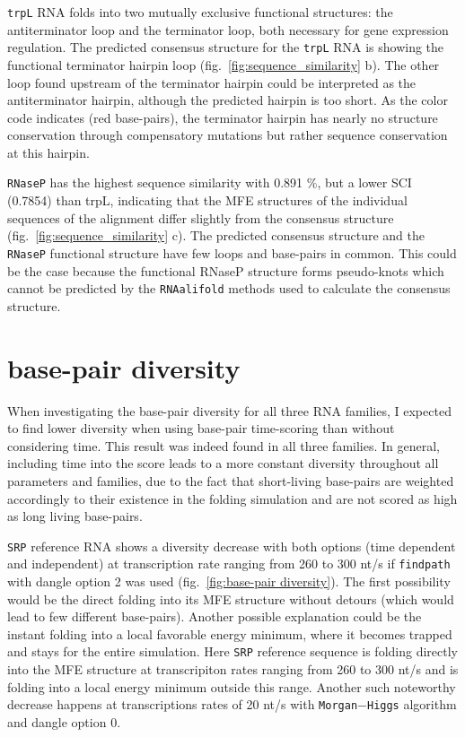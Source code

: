 \documentclass[ twoside,openright,titlepage,numbers=noenddot,headinclude,%
                footinclude=false, cleardoublepage=empty,abstractoff, %
                BCOR=5mm,paper=a4,fontsize=11pt,%
                ngerman,american,%
                ]{scrreprt}
\begin{document}
\texttt{trpL} RNA folds into two mutually exclusive functional structures: the
antiterminator loop and the terminator loop, both necessary for gene
expression regulation. The predicted consensus structure for the \texttt{trpL} RNA
is showing the functional terminator hairpin loop (fig.~\ref{fig:sequence_similarity} b). The other loop found
upstream of the terminator hairpin could be interpreted as the
antiterminator hairpin, although the predicted hairpin is too short. As the
color code indicates (red base-pairs), the terminator hairpin has nearly no
structure conservation through compensatory mutations but rather sequence
conservation at this hairpin.

\texttt{RNaseP} has the highest sequence similarity with 0.891 \%, but a lower SCI
(0.7854) than trpL, indicating that the MFE structures of the individual sequences of the
alignment differ slightly from the consensus structure (fig.~\ref{fig:sequence_similarity} c).
The predicted
consensus structure and the \texttt{RNaseP} functional structure have few loops and
base-pairs in common. This could be the case because the functional RNaseP
structure forms pseudo-knots which cannot be predicted by the
\texttt{RNAalifold} methods used to calculate the consensus structure.


\section{base-pair diversity}

When investigating the base-pair diversity for all three RNA families, I
expected to find lower diversity when using base-pair time-scoring than
without considering time. This result was indeed found in all three
families.
In general, including time into the score leads to a more constant diversity
throughout all parameters and families, due to the fact that short-living
base-pairs are weighted accordingly to their existence in the folding
simulation and are not scored as high as long living base-pairs.

\texttt{SRP} reference RNA shows a diversity decrease with both options (time
dependent and independent) at transcription rate ranging from 260 to 300
nt/s if \texttt{findpath} with dangle option 2 was used
(fig.~\ref{fig:base-pair diversity}).
The first possibility would be the direct folding into its MFE structure
without detours (which would lead to few different 
base-pairs). Another possible explanation could be the instant folding into
a local favorable energy minimum, where it becomes trapped and stays for
the entire simulation. Here \texttt{SRP} reference sequence is folding directly into the MFE structure at transcripiton rates ranging from 260 to 300 nt/s and is folding into a local energy minimum outside this range.
Another such noteworthy decrease happens at transcriptions rates of 20 nt/s with
\texttt{Morgan$-$Higgs} algorithm and dangle option $0$. 
\end{document}
